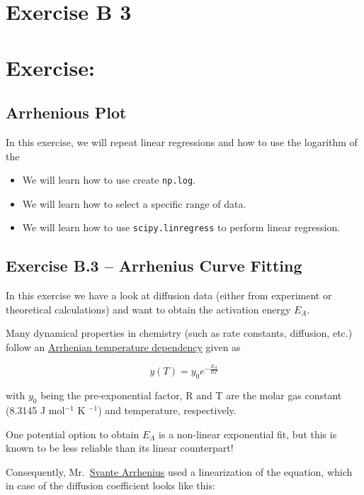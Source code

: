 \documentclass[
  letterpaper,
  DIV=11,
  numbers=noendperiod]{scrreprt}
\providecommand{\tightlist}{%
  \setlength{\itemsep}{0pt}\setlength{\parskip}{0pt}}\usepackage{longtable,booktabs,array}
\begin{document}
\chapter{Exercise B 3}\label{exercise-b-3}

\chapter{Exercise:}\label{exercise-3}

\section{Arrhenious Plot}\label{arrhenious-plot}

In this exercise, we will repeat linear regressions and how to use the
logarithm of the

\begin{itemize}
\tightlist
\item
  We will learn how to use create \texttt{np.log}.
\item
  We will learn how to select a specific range of data.
\item
  We will learn how to use \texttt{scipy.linregress} to perform linear
  regression.
\end{itemize}

\section{Exercise B.3 -- Arrhenius Curve
Fitting}\label{exercise-b.3-arrhenius-curve-fitting}

In this exercise we have a look at diffusion data (either from
experiment or theoretical calculations) and want to obtain the
activation energy \(E_A\).

Many dynamical properties in chemistry (such as rate constants,
diffusion, etc.) follow an
\href{https://en.wikipedia.org/wiki/Arrhenius_plot}{Arrhenian
temperature dependency} given as

\[ y(T) = y_0 e^{-\frac{E_A}{RT}} \]

with \(y_0\) being the pre-exponential factor, R and T are the molar gas
constant (8.3145 J mol\(^{-1}\) K \(^{-1}\)) and temperature,
respectively.

One potential option to obtain \(E_A\) is a non-linear exponential fit,
but this is known to be less reliable than its linear counterpart!

Consequently,
Mr.~\href{https://en.wikipedia.org/wiki/Svante_Arrhenius}{Svante
Arrhenius} used a linearization of the equation, which in case of the
diffusion coefficient looks like this:
\end{document}

